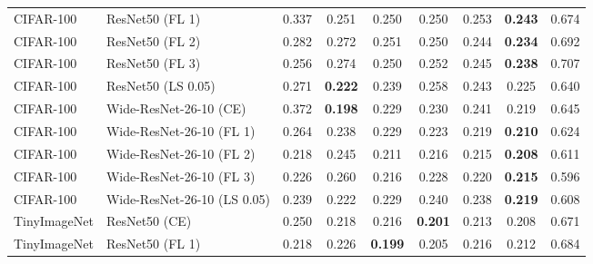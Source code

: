\begin{table}[h!]
{\begin{tabular}{llccccccc}
   CIFAR-100 &             ResNet50 (FL 1) &         0.337 &                  0.251 &                  0.250 &                  0.250 &                  0.253 & \textbf{0.243} &                  0.674 \\
   CIFAR-100 &             ResNet50 (FL 2) &         0.282 &                  0.272 &                  0.251 &                  0.250 &                  0.244 & \textbf{0.234} &                  0.692 \\
   CIFAR-100 &             ResNet50 (FL 3) &         0.256 &                  0.274 &                  0.250 &                  0.252 &                  0.245 & \textbf{0.238} &                  0.707 \\
   CIFAR-100 &          ResNet50 (LS 0.05) &         0.271 & \textbf{0.222} &                  0.239 &                  0.258 &                  0.243 &                  0.225 &                  0.640 \\
   CIFAR-100 &      Wide-ResNet-26-10 (CE) &         0.372 & \textbf{0.198} &                  0.229 &                  0.230 &                  0.241 &                  0.219 &                  0.645 \\
   CIFAR-100 &    Wide-ResNet-26-10 (FL 1) &         0.264 &                  0.238 &                  0.229 &                  0.223 &                  0.219 & \textbf{0.210} &                  0.624 \\
   CIFAR-100 &    Wide-ResNet-26-10 (FL 2) &         0.218 &                  0.245 &                  0.211 &                  0.216 &                  0.215 & \textbf{0.208} &                  0.611 \\
   CIFAR-100 &    Wide-ResNet-26-10 (FL 3) &         0.226 &                  0.260 &                  0.216 &                  0.228 &                  0.220 & \textbf{0.215} &                  0.596 \\
   CIFAR-100 & Wide-ResNet-26-10 (LS 0.05) &         0.239 &                  0.222 &                  0.229 &                  0.240 &                  0.238 & \textbf{0.219} &                  0.608 \\
TinyImageNet &               ResNet50 (CE) &         0.250 &                  0.218 &                  0.216 & \textbf{0.201} &                  0.213 &                  0.208 &                  0.671 \\
TinyImageNet &             ResNet50 (FL 1) &         0.218 &                  0.226 & \textbf{0.199} &                  0.205 &                  0.216 &                  0.212 &                  0.684 \\

\end{tabular}}
\end{table}
